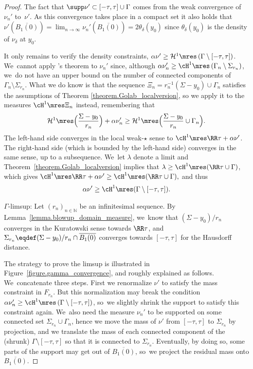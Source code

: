 \begin{proof}
The fact that $\supp\nu' \subset [-\tau, \tau]\cup \Gamma$ comes from the weak convergence of~$\nu_{n}'$ to~$\nu'$. As this convergence takes place in a compact set it also holds that $\nu'(\overline{B_1(0)}) = \lim_{n \to \infty} \nu_{n}'(\overline{B_1(0)}) = 2\theta_\delta(y_0)$ since $\theta_\delta(y_0)$ is the density of $\nu_\delta$ at $y_0$.

It only remains to verify the density constraints, $\alpha \nu' \ge \mathcal{H}^1\mres \left(\Gamma\setminus [-\tau,\tau]\right)$. We~cannot apply \Golab's theorem to $\nu_n'$ since, although $\alpha\nu_n' \ge \cH^1\mres \left( \Gamma_n\setminus \Sigma_{r_n}\right)$, we~do not have an upper bound on the number of connected components of $\Gamma_n\setminus \Sigma_{r_n}$. What we do know is that the sequence $\Xi_n = r_n^{-1}(\Sigma - y_0) \cup \Gamma_n$ satisfies the assumptions of Theorem \ref{theorem.Golab_localversion},
so we apply it to the measures $\cH^1\mres\Xi_n$ instead, remembering that
\begin{equation*}
\mathcal{H}^1\mres
\Bigl(
\frac{\Sigma - y_0}{r_n}
\Bigr)
+
\alpha\nu_n'
\ge
\mathcal{H}^1\mres
\Bigl(
\frac{\Sigma - y_0}{r_n}\cup\Gamma_n
\Bigl).
\end{equation*}
The left-hand side converges in the local weak-$\star$ sense to
$\cH^1\mres \RR\tau + \alpha\nu'$. The right-hand side
(which is bounded by the left-hand side)
converges in the same sense, up to a subsequence. We~let
$\lambda$ denote a limit and Theorem~\ref{theorem.Golab_localversion} implies that $\lambda \ge \cH^1\mres (\RR\tau\cup \Gamma)$, which gives
$
\cH^1\mres \RR\tau + \alpha\nu' \ge \cH^1\mres (\RR\tau\cup \Gamma),
$
and thus
\[
\alpha\nu' \ge \cH^1\mres(\Gamma\setminus [-\tau,\tau]).
\]

\par $\Gamma$-limsup: Let $(r_{n})_{n\in\mathbb{N}}$ be an infinitesimal sequence. By Lemma~\ref{lemma.blowup_domain_measure}, we~know that $(\Sigma-y_0)/r_{n}$ converges in the Kuratowski sense towards $\RR\tau$, and $\Sigma_{r_n}\eqdef (\Sigma-\nobreak y_0)/r_{n}\cap\nobreak\overline{B_1(0)}$ converges towards $[-\tau,\tau]$ for the Hausdorff distance.

The strategy to prove the limsup is illustrated in Figure~\ref{figure.gamma_convergence},
and roughly explained as follows. We~concatenate three steps. First we renormalize $\nu'$ to satisfy the mass constraint in $F_{r_{n}}$. But this normalization may break the condition $\alpha \nu_n'\ge \cH^1\mres \left(\Gamma\setminus [-\tau,\tau]\right)$, so~we slightly shrink the support to satisfy this constraint again. We~also need the measure $\nu_{n}'$ to be supported on some connected set $\Sigma_{r_{n}}\cup \Gamma_{n}$, hence we move the mass of $\nu'$ from $[-\tau,\tau]$ to $\Sigma_{r_n}$ by projection, and we translate the mass of each connected component of the (shrunk) $\Gamma\setminus [-\tau,\tau]$ so that it is connected to $\Sigma_{r_n}$. Eventually, by doing so, some parts of the support may get out of $\overline{B_1(0)}$, so~we project the residual mass onto $\overline{B_1(0)}$.


\end{proof}
